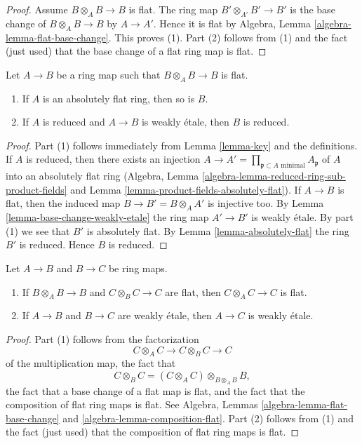 \begin{proof}
Assume $B \otimes_A B \to B$ is flat.
The ring map $B' \otimes_{A'} B' \to B'$ is the base change of
$B \otimes_A B \to B$ by $A \to A'$. Hence it is flat by
Algebra, Lemma \ref{algebra-lemma-flat-base-change}. This proves (1).
Part (2) follows from (1) and the fact (just used) that the
base change of a flat ring map is flat.
\end{proof}

\begin{lemma}
\label{lemma-absolutely-flat-over-absolutely-flat}
Let $A \to B$ be a ring map such that $B \otimes_A B \to B$ is flat.
\begin{enumerate}
\item If $A$ is an absolutely flat ring, then so is $B$.
\item If $A$ is reduced and $A \to B$ is weakly \'etale, then $B$ is reduced.
\end{enumerate}
\end{lemma}

\begin{proof}
Part (1) follows immediately from Lemma \ref{lemma-key} and the definitions.
If $A$ is reduced, then there exists an injection
$A \to A' = \prod_{\mathfrak p \subset A\text{ minimal}} A_\mathfrak p$
of $A$ into an absolutely flat ring
(Algebra, Lemma \ref{algebra-lemma-reduced-ring-sub-product-fields} and
Lemma \ref{lemma-product-fields-absolutely-flat}).
If $A \to B$ is flat, then the induced map $B \to B' = B \otimes_A A'$
is injective too. By Lemma \ref{lemma-base-change-weakly-etale}
the ring map $A' \to B'$ is weakly \'etale.
By part (1) we see that $B'$ is absolutely flat.
By Lemma \ref{lemma-absolutely-flat} the ring $B'$ is reduced.
Hence $B$ is reduced.
\end{proof}

\begin{lemma}
\label{lemma-composition-weakly-etale}
Let $A \to B$ and $B \to C$ be ring maps.
\begin{enumerate}
\item If $B \otimes_A B \to B$ and $C \otimes_B C \to C$
are flat, then $C \otimes_A C \to C$ is flat.
\item If $A \to B$ and $B \to C$ are weakly \'etale, then $A \to C$
is weakly \'etale.
\end{enumerate}
\end{lemma}

\begin{proof}
Part (1) follows from the factorization
$$
C \otimes_A C \longrightarrow C \otimes_B C \longrightarrow C
$$
of the multiplication map, the fact that
$$
C \otimes_B C = (C \otimes_A C) \otimes_{B \otimes_A B} B,
$$
the fact that a base change of a flat map is flat, and the
fact that the composition of flat ring maps is flat.
See Algebra, Lemmas \ref{algebra-lemma-flat-base-change} and
\ref{algebra-lemma-composition-flat}.
Part (2) follows from (1) and the fact (just used) that the
composition of flat ring maps is flat.
\end{proof}

